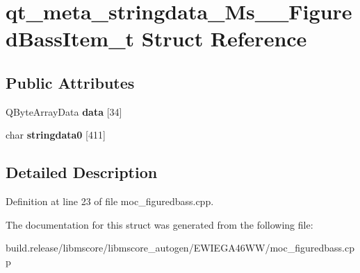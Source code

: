 \hypertarget{structqt__meta__stringdata___ms_____figured_bass_item__t}{}\section{qt\+\_\+meta\+\_\+stringdata\+\_\+\+Ms\+\_\+\+\_\+\+Figured\+Bass\+Item\+\_\+t Struct Reference}
\label{structqt__meta__stringdata___ms_____figured_bass_item__t}
\subsection*{Public Attributes}
\begin{DoxyCompactItemize}
\item 
\mbox{\label{structqt__meta__stringdata___ms_____figured_bass_item__t_a6cc6e400a8554851e624507c17d31b28}} 
Q\+Byte\+Array\+Data {\bfseries data} \mbox{[}34\mbox{]}
\item 
\mbox{\label{structqt__meta__stringdata___ms_____figured_bass_item__t_a77e3196ab75beaa5265feee7426775fd}} 
char {\bfseries stringdata0} \mbox{[}411\mbox{]}
\end{DoxyCompactItemize}


\subsection{Detailed Description}


Definition at line 23 of file moc\+\_\+figuredbass.\+cpp.



The documentation for this struct was generated from the following file\+:\begin{DoxyCompactItemize}
\item 
build.\+release/libmscore/libmscore\+\_\+autogen/\+E\+W\+I\+E\+G\+A46\+W\+W/moc\+\_\+figuredbass.\+cpp\end{DoxyCompactItemize}
